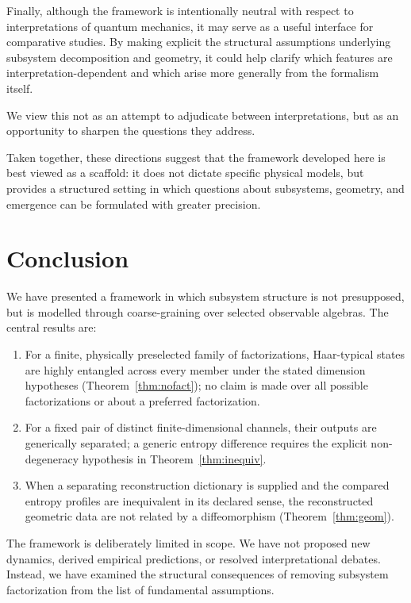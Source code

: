 \documentclass[12pt,a4paper]{article}
\begin{document}
Finally, although the framework is intentionally neutral with respect to interpretations of quantum mechanics, it may serve as a useful interface for comparative studies. 
By making explicit the structural assumptions underlying subsystem decomposition and geometry, it could help clarify which features are interpretation-dependent and which arise more generally from the formalism itself.

We view this not as an attempt to adjudicate between interpretations, but as an opportunity to sharpen the questions they address.

\medskip

Taken together, these directions suggest that the framework developed here is best viewed as a scaffold: it does not dictate specific physical models, but provides a structured setting in which questions about subsystems, geometry, and emergence can be formulated with greater precision.

\section{Conclusion}
\label{sec:conclusion}

We have presented a framework in which subsystem structure is not presupposed, but is modelled through coarse-graining over selected observable algebras. 
The central results are:

\begin{enumerate}
\item For a finite, physically preselected family of factorizations, Haar-typical states are highly entangled across every member under the stated dimension hypotheses (Theorem~\ref{thm:nofact}); no claim is made over all possible factorizations or about a preferred factorization.
\item For a fixed pair of distinct finite-dimensional channels, their outputs are generically separated; a generic entropy difference requires the explicit non-degeneracy hypothesis in Theorem~\ref{thm:inequiv}.
\item When a separating reconstruction dictionary is supplied and the compared entropy profiles are inequivalent in its declared sense, the reconstructed geometric data are not related by a diffeomorphism (Theorem~\ref{thm:geom}).
\end{enumerate}

The framework is deliberately limited in scope. 
We have not proposed new dynamics, derived empirical predictions, or resolved interpretational debates. 
Instead, we have examined the structural consequences of removing subsystem factorization from the list of fundamental assumptions.
\end{document}
